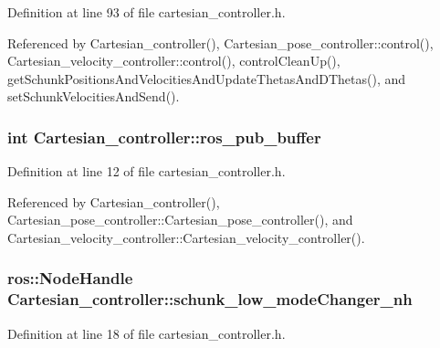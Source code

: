 Definition at line 93 of file cartesian\-\_\-controller.\-h.



Referenced by Cartesian\-\_\-controller(), Cartesian\-\_\-pose\-\_\-controller\-::control(), Cartesian\-\_\-velocity\-\_\-controller\-::control(), control\-Clean\-Up(), get\-Schunk\-Positions\-And\-Velocities\-And\-Update\-Thetas\-And\-D\-Thetas(), and set\-Schunk\-Velocities\-And\-Send().

\hypertarget{classCartesian__controller_ab9ed5a808da204dbc612d313dc7332f4}{
\subsubsection[{ros\-\_\-pub\-\_\-buffer}]{\setlength{\rightskip}{0pt plus 5cm}int Cartesian\-\_\-controller\-::ros\-\_\-pub\-\_\-buffer\hspace{0.3cm}{\ttfamily [protected]}}}\label{classCartesian__controller_ab9ed5a808da204dbc612d313dc7332f4}


Definition at line 12 of file cartesian\-\_\-controller.\-h.



Referenced by Cartesian\-\_\-controller(), Cartesian\-\_\-pose\-\_\-controller\-::\-Cartesian\-\_\-pose\-\_\-controller(), and Cartesian\-\_\-velocity\-\_\-controller\-::\-Cartesian\-\_\-velocity\-\_\-controller().

\hypertarget{classCartesian__controller_ad90134b232217e84cb58137a9d2030bb}{
\subsubsection[{schunk\-\_\-low\-\_\-mode\-Changer\-\_\-nh}]{\setlength{\rightskip}{0pt plus 5cm}ros\-::\-Node\-Handle Cartesian\-\_\-controller\-::schunk\-\_\-low\-\_\-mode\-Changer\-\_\-nh\hspace{0.3cm}{\ttfamily [protected]}}}\label{classCartesian__controller_ad90134b232217e84cb58137a9d2030bb}


Definition at line 18 of file cartesian\-\_\-controller.\-h.



